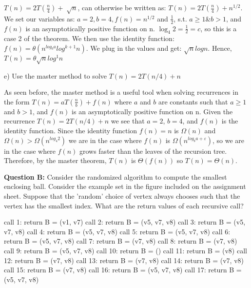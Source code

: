 \documentclass[12pt]{article}
\begin{document}
$T(n) = 2T(\frac{n}{4})+\sqrt[]{n}$, can otherwise be written as: $T(n) = 2T(\frac{n}{4})+n^{1/2}$. \\
We set our variables as: $a=2, b=4, f(n)=n^{1/2}$ and $\frac{1}{2}$, s.t. $a\geq1$\&$b>1$, and $f(n)$ is an asymptotically positive function on n. $\log_4 2 = \frac{1}{2} = c$, so this is a case 2 of the theorem. We then use the identity function: $f(n) = \theta(n^{log_ba}log^{k+1} n)$.
We plug in the values and get: $\sqrt{n}log n$. Hence, $T(n)= \theta\sqrt{n}log^1n$ 
\bigskip

e) Use the master method to solve $T(n) = 2T(n/4) + n$ \smallskip

As seen before, the master method is a useful tool when solving recurrences in the form $T(n) = aT(\frac{n}{b}) + f(n)$ where $a$ and $b$ are constants such that $a \geq 1$ and $b > 1$, and $f(n)$ is an asymptotically positive function on n. Given the recurrence $T(n) = 2T(n/4) + n$ we see that $a = 2$, $b = 4$, and $f(n)$ is the identity function. Since the identity function $f(n) = n$ is $\Omega (n)$ and $\Omega (n) > \Omega (n^{log_4 2})$ we are in the case where $f(n)$ is $\Omega (n^{log_b a + \varepsilon})$, so we are in the case where $f(n)$ grows faster than the leaves of the recursion tree. Therefore, by the master theorem, $T(n)$ is $\Theta (f(n))$ so $T(n) = \Theta (n)$. \bigskip

\noindent
\textbf{Question B:} Consider the randomized algorithm to compute the smallest enclosing ball. Consider the example set in the figure included on the assignment sheet. Suppose that the 'random' choice of vertex always chooses such that the vertex has the smallest index. What are the return values of each recursive call? \smallskip

call 1: return B = (v1, v7)
call 2: return B = (v5, v7, v8)
call 3: return B = (v5, v7, v8)
call 4: return B = (v5, v7, v8)
call 5: return B = (v5, v7, v8)
call 6: return B = (v5, v7, v8)
call 7: return B = (v7, v8)
call 8: return B = (v7, v8)
call 9: return B = (v5, v7, v8)
call 10: return B = ()
call 11: return B = (v8)
call 12: return B = (v7, v8)
call 13: return B = (v7, v8)
call 14: return B = (v7, v8)
call 15: return B = (v7, v8)
call 16: return B = (v5, v7, v8)
call 17: return B = (v5, v7, v8)
\end{document}
